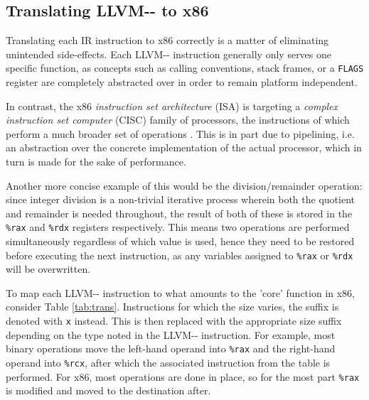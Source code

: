 \documentclass{article}
\begin{document}
\subsection{Translating LLVM-{}- to x86}

Translating each IR instruction to x86 correctly is a matter of eliminating unintended side-effects. Each LLVM-{}- instruction generally only serves one specific function, %
as concepts such as calling conventions, stack frames, or a \lstinline!FLAGS! register are completely abstracted over in order to remain platform independent.

In contrast, the x86 \textit{instruction set architecture} (ISA) is targeting a  \textit{complex instruction set computer} (CISC) family of processors, the instructions of which perform a much broader set of operations \cite[p.~190]{tiger}. This is in part due to pipelining, i.e. an abstraction over the concrete implementation of the actual processor, which in turn is made for the sake of performance.

Another more concise example of this would be the division/remainder operation: since integer division is a non-trivial iterative process wherein both the quotient and remainder is needed throughout, the result of both of these is stored in the \texttt{\%rax} and \texttt{\%rdx} registers respectively. This means two operations are performed simultaneously regardless of which value is used, hence they need to be restored before executing the next instruction, as any variables assigned to \lstinline!%rax! or \lstinline!%rdx! will be overwritten.

To map each LLVM-{}- instruction to what amounts to the 'core' function in x86, consider Table \ref{tab:trans}. Instructions for which the size varies, the suffix is denoted with \texttt{x} instead. This is then replaced with the appropriate size suffix depending on the type noted in the LLVM-{}- instruction. For example, most binary operations move the left-hand operand into \texttt{\%rax} and the right-hand operand into  \texttt{\%rcx}, after which the associated instruction from the table is performed. For x86, most operations are done in place, so for the most part \texttt{\%rax} is modified and moved to the destination after.
\end{document}
